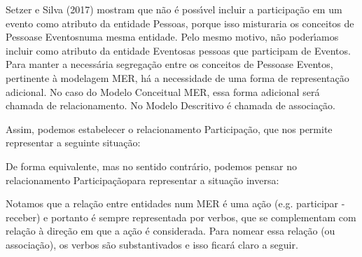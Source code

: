 \documentclass[
12pt,		%
openright,	%
twoside,  %
a4paper,			%
chapter=TITLE,		%
english,			%
french,				%
spanish,			%
brazil				%
]{USPSC-classe/USPSC}
\begin{document}
Setzer e Silva (2017) mostram que n\~ao \'e poss\'{\i}vel incluir a participa\c{c}\~ao em um evento como atributo da entidade \textquotedbl Pessoas\textquotedbl , porque isso misturaria os conceitos de \textquotedbl Pessoas\textquotedbl  e \textquotedbl Eventos\textquotedbl  numa mesma entidade. Pelo mesmo motivo, n\~ao poder\'{\i}amos incluir como atributo da entidade \textquotedbl Eventos\textquotedbl  as  pessoas que participam de \textquotedbl Eventos\textquotedbl . Para manter a necess\'aria segrega\c{c}\~ao entre os conceitos de \textquotedbl Pessoas\textquotedbl  e \textquotedbl Eventos\textquotedbl , pertinente \`a modelagem MER, h\'a a necessidade de uma forma de representa\c{c}\~ao adicional. No caso do Modelo Conceitual MER, essa forma adicional ser\'a chamada de \textquotedbl relacionamento\textquotedbl . No Modelo Descritivo \'e chamada de \textquotedbl associa\c{c}\~ao\textquotedbl .









Assim, podemos estabelecer o relacionamento \textquotedbl Participa\c{c}\~ao\textquotedbl , que nos permite representar a seguinte situa\c{c}\~ao:










\noindent\begin{center}\mbox{\centering{}}\end{center}


De forma equivalente, mas no sentido contr\'ario, podemos pensar no  relacionamento \textquotedbl Participa\c{c}\~ao\textquotedbl  para representar a situa\c{c}\~ao inversa:










\noindent\begin{center}\mbox{\centering{}}\end{center}


Notamos que a rela\c{c}\~ao entre entidades num MER \'e uma a\c{c}\~ao (e.g. participar - receber) e portanto \'e sempre representada por verbos, que se complementam com rela\c{c}\~ao \`a dire\c{c}\~ao em que a a\c{c}\~ao \'e considerada. Para nomear essa rela\c{c}\~ao (ou associa\c{c}\~ao), os verbos s\~ao substantivados e isso ficar\'a claro a seguir.
\end{document}
